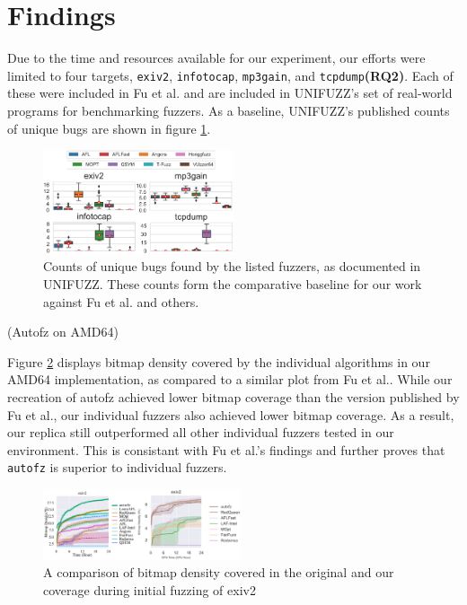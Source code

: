 \section{Findings}

Due to the time and resources available for our experiment, our efforts were limited 
to four targets, \texttt{exiv2}, \texttt{infotocap}, \texttt{mp3gain}, and 
\texttt{tcpdump}\textbf{(RQ2)}. Each of these were included in Fu et al.\cite{fu_autofz_2023} 
and are included in UNIFUZZ's\cite{li_unifuzz_2021} set of real-world programs for 
benchmarking fuzzers. As a baseline, UNIFUZZ's published counts of unique bugs are 
shown in figure \ref{fig:unifuzz_selections}.

\begin{figure}[h!]
    \includegraphics[width=0.5\textwidth]{figs/unifuzz_selections.png}
    \centering
    \caption{Counts of unique bugs found by the listed fuzzers, as documented in 
    UNIFUZZ\cite{li_unifuzz_2021}. These counts form the comparative baseline for 
    our work against Fu et al.\cite{fu_autofz_2023} and others.}
    \label{fig:unifuzz_selections}
\end{figure}

\substection(Autofz on AMD64)

Figure \ref{fig:exiv2_compare_orig_arm64} displays bitmap density covered by the individual algorithms in our AMD64 implementation, 
as compared to a similar plot from Fu et al.\cite{fu_autofz_2023}. While our recreation of autofz achieved lower bitmap coverage than 
the version published by Fu et al., our individual fuzzers also achieved lower bitmap coverage. As a result, our replica still 
outperformed all other individual fuzzers tested in our environment. This is consistant
with Fu et al.'s findings and further proves that \texttt{autofz} is superior to individual fuzzers.

\begin{figure}
    \includegraphics[width=0.52\textwidth]{figs/exiv2_compare_orig_arm64.png}
    \centering
    \caption{A comparison of bitmap density covered in the original\cite{fu_autofz_2023} and our 
    coverage during initial fuzzing of exiv2}
    \label{fig:exiv2_compare_orig_arm64}
\end{figure}

